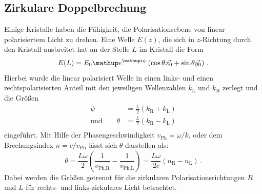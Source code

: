 \subsection{Zirkulare Doppelbrechung} %
\label{sub:doppelbrechung}
Einige Kristalle haben die Fähigkeit, die Polarisationsebene von linear
polarisiertem Licht zu drehen. Eine Welle $E(z)$, die sich in $z$-Richtung
durch den Kristall ausbreitet hat an der Stelle $L$ im Kristall die Form
\begin{equation}
    \label{eqn:energie_final}
    E(L) = E_0\e^{\i\psi}\left(
        \cos\theta\vec{x_0} + \sin\theta\vec{y_0}
    \right)\,.
\end{equation}
Hierbei wurde die linear polarisiert Welle in einen links- und einen
rechtspolarisierten Anteil mit den jeweiligen Wellenzahlen $k_\text{L}$ und
$k_\text{R}$ zerlegt und die Größen
\begin{align*}
    \psi   &= \frac{L}{2}\left(k_\text{R}+k_\text{L}\right)\\
    \text{und}\qquad\theta &= \frac{L}{2}\left(k_\text{R}-k_\text{L}\right)\\
\end{align*}
eingeführt.
Mit Hilfe der Phasengeschwindigkeit $v_\text{Ph} = \omega/k$, oder dem
Brechungsindex $n=c/v_\text{Ph}$ lässt sich $\theta$ darstellen als:
\begin{equation}
    \label{eqn:theta}
    \theta = \frac{L\omega}{2}
    \left(
        \frac{1}{v_\text{Ph,R}} - \frac{1}{v_\text{Ph,L}}
    \right)
    = \frac{L\omega}{2c}\left(n_\text{R}-n_\text{L}\right)\,.
\end{equation}
Dabei werden die Größen getrennt für die zirkularen Polarisationsrichtungen
$R$ und $L$ für rechts- und links-zirkulares Licht betrachtet.

